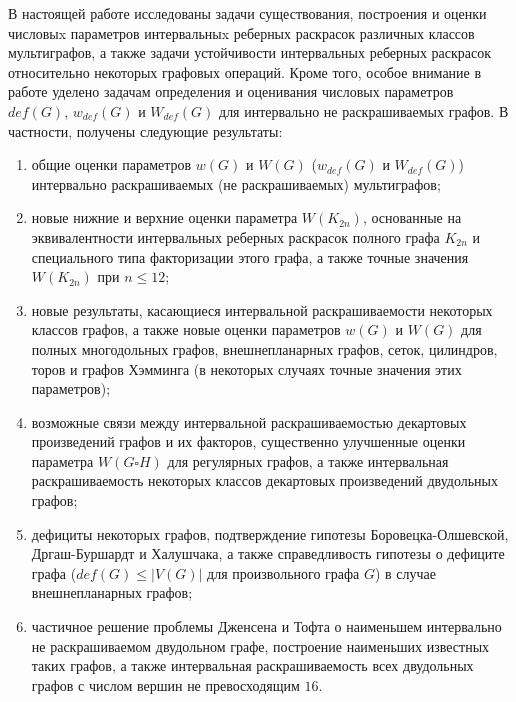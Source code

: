 В настоящей работе исследованы задачи существования, построения и оценки числовыx параметров интервальныx реберных раскрасок различных классов мультиграфов, а также задачи устойчивости интервальных реберных раскрасок относительно некоторых графовых операций. Кроме того, особое внимание в работе уделено задачам определения и оценивания числовых параметров $def(G)$, $w_{def}(G)$ и $W_{def}(G)$ для интервально не раскрашиваемых графов. В частности, получены следующие результаты: 

\begin{enumerate}
    \item общие оценки параметров $w(G)$ и $W(G)$ ($w_{def}(G)$ и $W_{def}(G)$) интервально раскрашиваемых (не раскрашиваемых) мультиграфов;

    \item новые нижние и верхние оценки параметра $W(K_{2n})$, основанные на эквивалентности интервальных реберных раскрасок полного графа $K_{2n}$ и специального типа факторизации этого графа, а также точные значения $W(K_{2n})$ при $n\leq 12$;
    
    \item новые результаты, касающиеся интервальной раскрашиваемости некоторых классов графов, а также новые оценки параметров $w(G)$ и $W(G)$ для полных многодольных графов, внешнепланарных графов, сеток, цилиндров, торов и графов Хэмминга (в некоторых случаях точные значения этих параметров);
    
    \item возможные связи между интервальной раскрашиваемостью декартовых произведений графов и их факторов, существенно улучшенные оценки параметра $W(G \square H)$ для регулярных графов, а также интервальная раскрашиваемость некоторых классов декартовых произведений  двудольных графов;
    
    \item дефициты некоторых графов, подтверждение гипотезы Боровецка-Олшевской, Дргаш-Буршардт и Халушчака, а также справедливость гипотезы о дефиците графа ($def(G) \leq |V(G)|$ для произвольного графа $G$) в случае внешнепланарных графов;
    
    \item частичное решение проблемы Дженсена и Тофта о наименьшем интервально не раскрашиваемом двудольном графе, построение наименьших известных таких графов, а также интервальная раскрашиваемость всех двудольных графов с числом вершин не превосходящим $16$.

\end{enumerate}